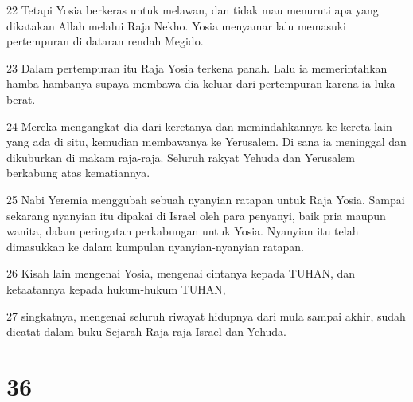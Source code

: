 \par 22 Tetapi Yosia berkeras untuk melawan, dan tidak mau menuruti apa yang dikatakan Allah melalui Raja Nekho. Yosia menyamar lalu memasuki pertempuran di dataran rendah Megido.
\par 23 Dalam pertempuran itu Raja Yosia terkena panah. Lalu ia memerintahkan hamba-hambanya supaya membawa dia keluar dari pertempuran karena ia luka berat.
\par 24 Mereka mengangkat dia dari keretanya dan memindahkannya ke kereta lain yang ada di situ, kemudian membawanya ke Yerusalem. Di sana ia meninggal dan dikuburkan di makam raja-raja. Seluruh rakyat Yehuda dan Yerusalem berkabung atas kematiannya.
\par 25 Nabi Yeremia menggubah sebuah nyanyian ratapan untuk Raja Yosia. Sampai sekarang nyanyian itu dipakai di Israel oleh para penyanyi, baik pria maupun wanita, dalam peringatan perkabungan untuk Yosia. Nyanyian itu telah dimasukkan ke dalam kumpulan nyanyian-nyanyian ratapan.
\par 26 Kisah lain mengenai Yosia, mengenai cintanya kepada TUHAN, dan ketaatannya kepada hukum-hukum TUHAN,
\par 27 singkatnya, mengenai seluruh riwayat hidupnya dari mula sampai akhir, sudah dicatat dalam buku Sejarah Raja-raja Israel dan Yehuda.

\chapter{36}

